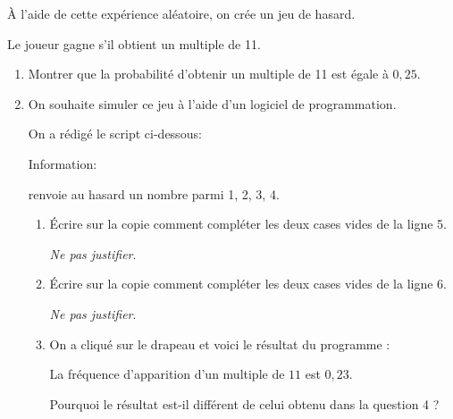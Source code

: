 \documentclass[11pt]{article}
\begin{document}
À l'aide de cette expérience aléatoire, on crée un jeu de hasard.

Le joueur gagne s'il obtient un multiple de 11.

\begin{enumerate}[resume]
\item Montrer que la probabilité d'obtenir un multiple de 11 est égale à $0,25$.
\item On souhaite simuler ce jeu à l'aide d'un logiciel de programmation.

On a rédigé le script ci-dessous:

\begin{center}
\begin{scratch}
{%
{%
}%
}%
\end{scratch}
\end{center}

Information:

 renvoie au hasard un nombre parmi 1, 2, 3, 4.
	\begin{enumerate}
		\item Écrire sur la copie comment compléter les deux cases vides de la ligne 5.

\emph{Ne pas justifier}.
		\item Écrire sur la copie comment compléter les deux cases vides de la ligne 6.

\emph{Ne pas justifier}.
		\item On a cliqué sur le drapeau et voici le résultat du programme :

\og La fréquence d'apparition d'un multiple de $11$ est $0,23$. \fg

Pourquoi le résultat est-il différent de celui obtenu dans la question 4 ?
	\end{enumerate}
\end{enumerate}
\newpage
\hypertarget{Caledoniedec}{}
\end{document}
